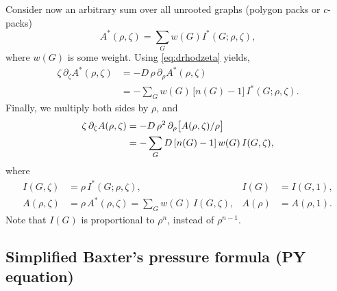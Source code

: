 \documentclass[preprint]{revtex4-1}
\newcommand{\vct}[1]{\mathbf{#1}}
\providecommand{\vr}{} %
\renewcommand{\vr}{\vct{r}}
\begin{document}
Consider now an arbitrary sum over all unrooted graphs (polygon packs or $c$-packs)
\[
  A^*(\rho, \zeta) = \sum_G w(G) I^*(G; \rho, \zeta),
\]
where $w(G)$ is some weight.
%
Using \eqref{eq:drhodzeta} yields,
\begin{align*}
  \zeta \, \partial_\zeta A^*(\rho, \zeta)
&=
  -D \, \rho \, \partial_\rho A^*(\rho, \zeta)
  \\
&=
  -\sum_G w(G) \, \bigl[ n(G) - 1 \bigr] \, I^*(G; \rho, \zeta).
\end{align*}
%
Finally, we multiply both sides by $\rho$, and
%
\begin{align}
  \zeta \, \partial_\zeta A(\rho, \zeta) %
  &= -D \, \rho^2 \, \partial_\rho \big[ A(\rho, \zeta)/\rho \big] \notag \\
  &= -\sum_G D \, [n(G) - 1] \, w(G) \, I(G, \zeta),
  \label{eq:virialtheorem}
\end{align}
where
\begin{align*}
  I(G, \zeta)    &= \rho \, I^*(G; \rho, \zeta), &
            I(G) &= I(G, 1), \\
  A(\rho, \zeta) &= \rho \, A^*(\rho, \zeta) = \sum_G w(G) \, I(G, \zeta), &
         A(\rho) &= A(\rho, 1).
\end{align*}
%
Note that
$I(G)$ is
proportional to $\rho^n$, instead of $\rho^{n-1}$.




\subsection{\label{sec:vtpy}Simplified Baxter's pressure formula (PY equation)}
\end{document}
